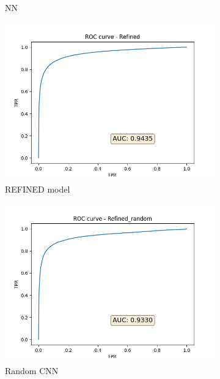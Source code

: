 \begin{figure}
\begin{subfigure}{0.45\textwidth}
    \caption{NN}
\end{subfigure}%
\begin{subfigure}{0.45\textwidth}
    \centering
    \includegraphics[width=0.95\linewidth]{refined_roc.png}
    \caption{REFINED model}
\end{subfigure}
\begin{subfigure}{0.45\textwidth}
    \centering
    \includegraphics[width=0.95\linewidth]{random_roc.png}
    \caption{Random CNN}
\end{subfigure}%
\begin{subfigure}{0.45\textwidth}
    \centering

\end{subfigure}
\end{figure}
